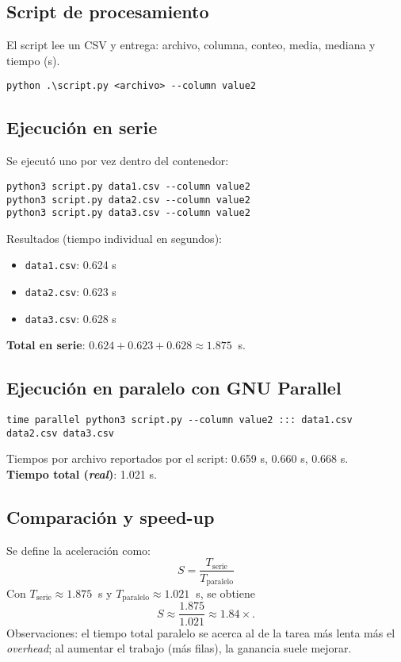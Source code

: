 \documentclass[11pt,a4paper]{article}
\newcommand{\code}[1]{\texttt{#1}}
\begin{document}
\subsection{Script de procesamiento}
El script lee un CSV y entrega: archivo, columna, conteo, media, mediana y tiempo (s).
\begin{lstlisting}[style=cmd]
python .\script.py <archivo> --column value2
\end{lstlisting}

\subsection{Ejecución en serie}
Se ejecutó uno por vez dentro del contenedor:
\begin{lstlisting}[style=cmd]
python3 script.py data1.csv --column value2
python3 script.py data2.csv --column value2
python3 script.py data3.csv --column value2
\end{lstlisting}
Resultados (tiempo individual en segundos):
\begin{itemize}
  \item \code{data1.csv}: \SI{0.624}{} s
  \item \code{data2.csv}: \SI{0.623}{} s
  \item \code{data3.csv}: \SI{0.628}{} s
\end{itemize}
\textbf{Total en serie}: $0.624 + 0.623 + 0.628 \approx \SI{1.875}{}$ s.

\subsection{Ejecución en paralelo con GNU Parallel}
\begin{lstlisting}[style=cmd]
time parallel python3 script.py --column value2 ::: data1.csv data2.csv data3.csv
\end{lstlisting}
Tiempos por archivo reportados por el script: \SI{0.659}{} s, \SI{0.660}{} s, \SI{0.668}{} s.
\\\textbf{Tiempo total (\emph{real})}: \SI{1.021}{} s.

\subsection{Comparación y speed-up}
Se define la aceleración como:
\begin{equation}
  S = \frac{T_{\text{serie}}}{T_{\text{paralelo}}}
\end{equation}
Con $T_{\text{serie}} \approx \SI{1.875}{}$ s y $T_{\text{paralelo}} \approx \SI{1.021}{}$ s, se obtiene
\begin{equation}
  S \approx \frac{1.875}{1.021} \approx 1.84\times.
\end{equation}
\noindent
Observaciones: el tiempo total paralelo se acerca al de la tarea más lenta más el \emph{overhead}; al aumentar el trabajo (más filas), la ganancia suele mejorar.
\end{document}
